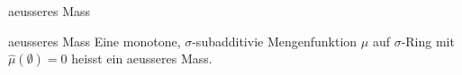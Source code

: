 \documentclass[class=article, crop=false]{standalone}
\begin{document}
\begin{zettel}{aeusseres Mass}
\begin{flashcard}[ap4pcsvo]{aeusseres Mass}
	Eine monotone, $\sigma$-subadditivie Mengenfunktion $\hat{\mu }$ auf $\sigma$-Ring mit $\hat{\mu }(\emptyset )= 0$  heisst ein aeusseres Mass.
\end{flashcard}
\end{zettel}
\end{document}
